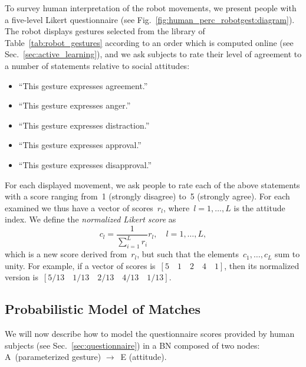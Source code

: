 To survey human interpretation of the robot movements, we present people with a five-level Likert questionnaire (see Fig.~\ref{fig:human_perc_robotgest:diagram}). The robot displays gestures selected from the library of Table~\ref{tab:robot_gestures} according to an order which is computed online (see Sec.~\ref{sec:active_learning}), and we ask subjects to rate their level of agreement to a number of statements relative to social attitudes:
\begin{itemize}
\item ``This gesture expresses agreement.''

\item ``This gesture expresses anger.''

\item ``This gesture expresses distraction.''

\item ``This gesture expresses approval.''

\item ``This gesture expresses disapproval.''
\end{itemize}

For each displayed movement, we ask people to rate each of the above statements with a score ranging from~1 (strongly disagree) to~5 (strongly agree). For each examined \gestparval{} we thus have a vector of scores~$r_l$, where~$l = 1, \dots, L$ is the attitude index. We define the \emph{normalized Likert score} as
\begin{equation} \label{eq:normalized_likert_score}
c_l = \frac{1}{\sum_{i=1}^L r_i} r_l, \quad l = 1, \dots, L,
\end{equation}
which is a new score derived from~$r_l$, but such that the elements~$c_1, \dots, c_L$ sum to unity. For example, if a vector of scores is~$[5 \quad 1 \quad 2 \quad 4 \quad 1]$, then its normalized version is~$[5/13 \quad 1/13 \quad 2/13 \quad 4/13 \quad 1/13]$.


\subsection{Probabilistic Model of \GestAtt{} Matches}

We will now describe how to model the questionnaire scores provided by human subjects (see Sec.~\ref{sec:questionnaire}) in a \acl{BN} composed of two nodes: A~(parameterized gesture) $\to$~E (attitude).

